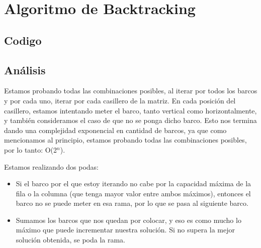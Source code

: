 \section{Algoritmo de Backtracking}
\label{sec:backtracking}

\subsection{Codigo}



\subsection{Análisis}

Estamos probando todas las combinaciones posibles, al iterar por todos los barcos y por cada uno, iterar por cada casillero de la matriz. En cada posición del casillero, estamos intentando meter el barco, tanto vertical como horizontalmente, y también consideramos el caso de que no se ponga dicho barco. Esto nos termina dando una complejidad exponencial en cantidad de barcos, ya que como mencionamos al principio, estamos probando todas las combinaciones posibles, por lo tanto: O(2$^n$).

Estamos realizando dos podas:

\begin{itemize}
    \item Si el barco por el que estoy iterando no cabe por la capacidad máxima de la fila o la columna (que tenga mayor valor entre ambos máximos), entonces el barco no se puede meter en esa rama, por lo que se pasa al siguiente barco. 
    \item Sumamos los barcos que nos quedan por colocar, y eso es como mucho lo máximo que puede incrementar nuestra solución. Si no supera la mejor solución obtenida, se poda la rama.
\end{itemize}